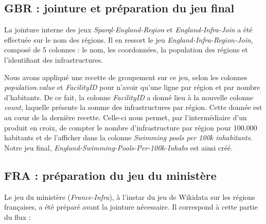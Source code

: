 \documentclass[hidelinks, 12pt]{report}
\begin{document}
%





\subsection{GBR : jointure et préparation du jeu final}

La jointure interne des jeux \textit{Sparql-England-Region} et \textit{England-Infra-Join} a été effectuée sur le nom des régions. Il en ressort le jeu \textit{England-Infra-Region-Join}, composé de 5 colonnes : le nom, les coordonnées, la population des régions et l'identifiant des infrastructures.

Nous avons appliqué une recette de groupement sur ce jeu, selon les colonnes \textit{population.value} et \textit{FacilityID} pour n'avoir qu'une ligne par région et par nombre d'habitants. De ce fait, la colonne \textit{FacilityID} a donné lieu à la nouvelle colonne \textit{count}, laquelle présente la somme des infrastructures par région. Cette donnée est au cœur de la dernière recette. Celle-ci nous permet, par l'intermédiaire d'un produit en croix, de compter le nombre d'infrastructure par région pour 100.000 habitants et de l'afficher dans la colonne \textit{Swimming pools per 100k inhabitants}. Notre jeu final, \textit{England-Swimming-Pools-Per-100k-Inhabs} est ainsi créé.





%





\subsection{FRA : préparation du jeu du ministère}

Le jeu du ministère (\textit{France-Infra}), à l'instar du jeu de Wikidata sur les régions françaises, a été préparé avant la jointure nécessaire. Il correspond à cette partie du flux :
\end{document}
